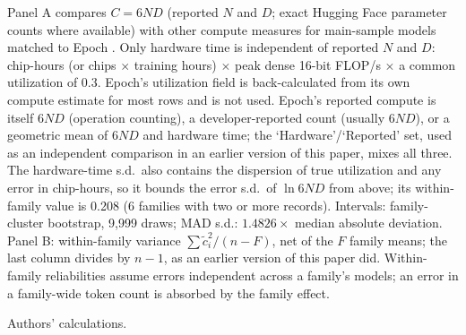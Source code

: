 \begin{table}[tp]
\begin{tablenotes}
Panel A compares $C=6ND$ (reported $N$ and $D$; exact Hugging Face parameter counts where available) with other compute measures for main-sample models matched to Epoch \citep{epochai2026data}. Only hardware time is independent of reported $N$ and $D$: chip-hours (or chips $\times$ training hours) $\times$ peak dense 16-bit FLOP/s $\times$ a common utilization of 0.3. Epoch's utilization field is back-calculated from its own compute estimate for most rows and is not used. Epoch's reported compute is itself $6ND$ (operation counting), a developer-reported count (usually $6ND$), or a geometric mean of $6ND$ and hardware time; the `Hardware'/`Reported' set, used as an independent comparison in an earlier version of this paper, mixes all three. The hardware-time s.d.\ also contains the dispersion of true utilization and any error in chip-hours, so it bounds the error s.d.\ of $\ln 6ND$ from above; its within-family value is 0.208 (6 families with two or more records). Intervals: family-cluster bootstrap, 9,999 draws; MAD s.d.: $1.4826\times$ median absolute deviation. Panel B: within-family variance $\sum\tilde c_i^2/(n-F)$, net of the $F$ family means; the last column divides by $n-1$, as an earlier version of this paper did. Within-family reliabilities assume errors independent across a family's models; an error in a family-wide token count is absorbed by the family effect.
\end{tablenotes}
\begin{tablenotes}[Source]
Authors' calculations.
\end{tablenotes}
\end{table}
